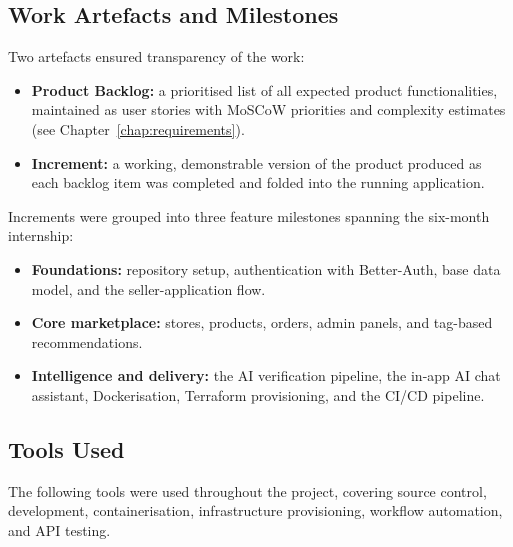 \documentclass[12pt, a4paper, oneside]{report}
\begin{document}
\subsection{Work Artefacts and Milestones}

Two artefacts ensured transparency of the work:

\begin{itemize}[leftmargin=*,itemsep=4pt]
  \item \textbf{Product Backlog:} a prioritised list of all expected
        product functionalities, maintained as user stories with
        MoSCoW priorities and complexity estimates (see
        Chapter~\ref{chap:requirements}).
  \item \textbf{Increment:} a working, demonstrable version of the
        product produced as each backlog item was completed and folded
        into the running application.
\end{itemize}

Increments were grouped into three feature milestones spanning the
six-month internship:

\begin{itemize}[leftmargin=*,itemsep=4pt]
  \item \textbf{Foundations:} repository setup,
        authentication with Better-Auth, base data model, and the
        seller-application flow.
  \item \textbf{Core marketplace:} stores, products,
        orders, admin panels, and tag-based recommendations.
  \item \textbf{Intelligence and delivery:} the AI
        verification pipeline, the in-app AI chat assistant,
        Dockerisation, Terraform provisioning, and the CI/CD
        pipeline.
\end{itemize}

\subsection{Tools Used}

The following tools were used throughout the project, covering source
control, development, containerisation, infrastructure provisioning,
workflow automation, and API testing.
\end{document}

